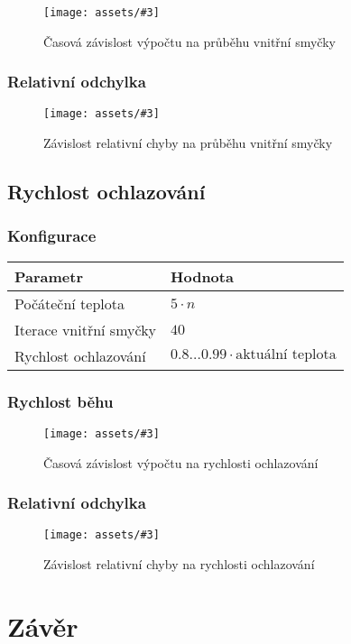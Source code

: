 \documentclass[czech]{article}
\newcommand{\image}[3]{
    \begin{figure}[H]
        \centering
        \texttt{[image: assets/\#3]}
        \caption{#2}
        \label{fig:#1}
    \end{figure}
}
\begin{document}
\image{dur-inner-loop}{Časová závislost výpočtu na průběhu vnitřní smyčky}{dur-inner-loop.png}

\subsubsection*{Relativní odchylka}

\image{acc-inner-loop}{Závislost relativní chyby na průběhu vnitřní smyčky}{acc-inner-loop.png}

\subsection{Rychlost ochlazování}

\subsubsection*{Konfigurace}

\begin{tabular}{ | l | l | }
    \hline
    Parametr & Hodnota \\ \hline \hline
    Počáteční teplota & $5 \cdot n$ \\
    Iterace vnitřní smyčky & $40$ \\
    Rychlost ochlazování & $0.8\dots0.99 \cdot \textrm{aktuální teplota}$ \\ \hline
\end{tabular}

\subsubsection*{Rychlost běhu}

\image{dur-temperature-factor}{Časová závislost výpočtu na rychlosti ochlazování}{dur-temperature-factor.png}

\subsubsection*{Relativní odchylka}

\image{acc-temperature-factor}{Závislost relativní chyby na rychlosti ochlazování}{acc-temperature-factor.png}

\section{Závěr}
\end{document}
